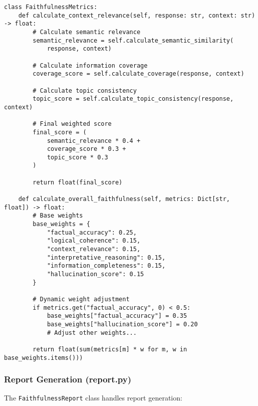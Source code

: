 \begin{lstlisting}[basicstyle=\ttfamily\small,breaklines=true,columns=flexible]
class FaithfulnessMetrics:
    def calculate_context_relevance(self, response: str, context: str) -> float:
        # Calculate semantic relevance
        semantic_relevance = self.calculate_semantic_similarity(
            response, context)
        
        # Calculate information coverage
        coverage_score = self.calculate_coverage(response, context)
        
        # Calculate topic consistency
        topic_score = self.calculate_topic_consistency(response, context)
        
        # Final weighted score
        final_score = (
            semantic_relevance * 0.4 +
            coverage_score * 0.3 +
            topic_score * 0.3
        )
        
        return float(final_score)
        
    def calculate_overall_faithfulness(self, metrics: Dict[str, float]) -> float:
        # Base weights
        base_weights = {
            "factual_accuracy": 0.25,
            "logical_coherence": 0.15,
            "context_relevance": 0.15,
            "interpretative_reasoning": 0.15,
            "information_completeness": 0.15,
            "hallucination_score": 0.15
        }
        
        # Dynamic weight adjustment
        if metrics.get("factual_accuracy", 0) < 0.5:
            base_weights["factual_accuracy"] = 0.35
            base_weights["hallucination_score"] = 0.20
            # Adjust other weights...
        
        return float(sum(metrics[m] * w for m, w in base_weights.items()))
\end{lstlisting}

\subsubsection{Report Generation (report.py)}
The \texttt{FaithfulnessReport} class handles report generation:

